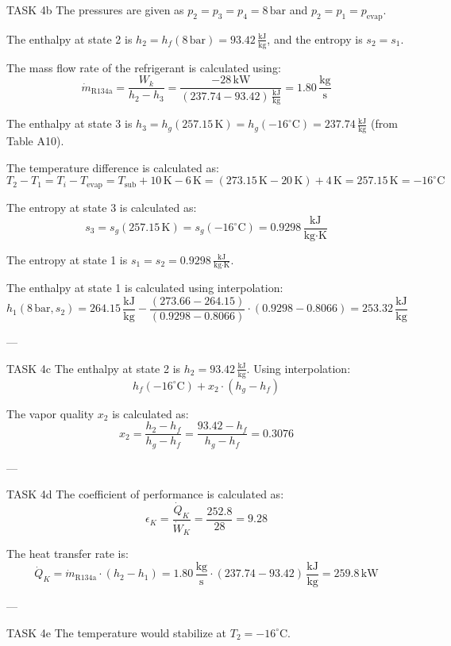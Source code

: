 TASK 4b  
The pressures are given as \( p_2 = p_3 = p_4 = 8 \, \text{bar} \) and \( p_2 = p_1 = p_{\text{evap}} \).  

The enthalpy at state 2 is \( h_2 = h_f(8 \, \text{bar}) = 93.42 \, \frac{\text{kJ}}{\text{kg}} \), and the entropy is \( s_2 = s_1 \).  

The mass flow rate of the refrigerant is calculated using:  
\[
\dot{m}_{\text{R134a}} = \frac{W_k}{h_2 - h_3} = \frac{-28 \, \text{kW}}{(237.74 - 93.42) \, \frac{\text{kJ}}{\text{kg}}} = 1.80 \, \frac{\text{kg}}{\text{s}}
\]  

The enthalpy at state 3 is \( h_3 = h_g(257.15 \, \text{K}) = h_g(-16^\circ\text{C}) = 237.74 \, \frac{\text{kJ}}{\text{kg}} \) (from Table A10).  

The temperature difference is calculated as:  
\[
T_2 - T_1 = T_i - T_{\text{evap}} = T_{\text{sub}} + 10 \, \text{K} - 6 \, \text{K} = (273.15 \, \text{K} - 20 \, \text{K}) + 4 \, \text{K} = 257.15 \, \text{K} = -16^\circ\text{C}
\]  

The entropy at state 3 is calculated as:  
\[
s_3 = s_g(257.15 \, \text{K}) = s_g(-16^\circ\text{C}) = 0.9298 \, \frac{\text{kJ}}{\text{kg·K}}
\]  

The entropy at state 1 is \( s_1 = s_2 = 0.9298 \, \frac{\text{kJ}}{\text{kg·K}} \).  

The enthalpy at state 1 is calculated using interpolation:  
\[
h_1(8 \, \text{bar}, s_2) = 264.15 \, \frac{\text{kJ}}{\text{kg}} - \frac{(273.66 - 264.15)}{(0.9298 - 0.8066)} \cdot (0.9298 - 0.8066) = 253.32 \, \frac{\text{kJ}}{\text{kg}}
\]  

---

TASK 4c  
The enthalpy at state 2 is \( h_2 = 93.42 \, \frac{\text{kJ}}{\text{kg}} \). Using interpolation:  
\[
h_f(-16^\circ\text{C}) + x_2 \cdot (h_g - h_f)
\]  

The vapor quality \( x_2 \) is calculated as:  
\[
x_2 = \frac{h_2 - h_f}{h_g - h_f} = \frac{93.42 - h_f}{h_g - h_f} = 0.3076
\]  

---

TASK 4d  
The coefficient of performance is calculated as:  
\[
\epsilon_K = \frac{\dot{Q}_K}{\dot{W}_K} = \frac{252.8}{28} = 9.28
\]  

The heat transfer rate is:  
\[
\dot{Q}_K = \dot{m}_{\text{R134a}} \cdot (h_2 - h_1) = 1.80 \, \frac{\text{kg}}{\text{s}} \cdot (237.74 - 93.42) \, \frac{\text{kJ}}{\text{kg}} = 259.8 \, \text{kW}
\]  

---

TASK 4e  
The temperature would stabilize at \( T_2 = -16^\circ\text{C} \).